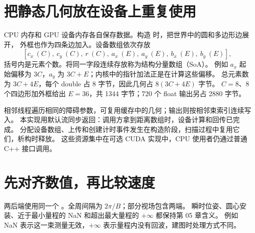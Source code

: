 \section{把静态几何放在设备上重复使用}
CPU 内存和 GPU 设备内存各自保存数据。构造  时，把世界中的圆和多边形边展开，
外框也作为四条边加入。设备数组依次存放
\[
 [c_x\ (C),\ c_y\ (C),\ r\ (C),\ a_x\ (E),\ a_y\ (E),\ b_x\ (E),\ b_y\ (E)],
\]
括号内是元素个数。将同一字段连续存放称为结构分量数组（SoA）。
例如 $a_x$ 起始偏移为 $3C$，$a_y$ 为 $3C+E$；内核中的指针加法正是在计算这些偏移。
总元素数为 $3C+4E$，每个 double 占 8 字节，因此几何占 $8(3C+4E)$ 字节。
$C=8$、8 个四边形加外框给出 $E=36$，共 1344 字节；720 个 float 输出另占 2880 字节。

\begin{center}\begin{minipage}{\linewidth}\makeatletter{}\makeatother
\centering
{}
\caption{扫描的数据流。几何与设备输出缓存跨帧复用，每帧传入位姿并取回本帧距离。}
\end{minipage}\end{center}

相邻线程遍历相同的障碍参数，可复用缓存中的几何；输出则按相邻束索引连续写入。
本实现用默认流同步返回：调用方拿到距离数组时，设备计算和回传已完成。
分配设备数组、上传和创建计时事件发生在构造阶段，扫描过程中复用它们，析构时释放。
这些资源集中在可选 CUDA 实现中，CPU 使用者仍通过普通 C++ 接口调用。

\section{先对齐数值，再比较速度}
两后端使用同一个 。全周间隔为 $2\pi/B$；部分视场包含两端。
瞬时位姿、圆心安装、近于最小量程的 NaN 和超出最大量程的 $+\infty$ 都保持第 05 章含义。
例如 NaN 表示这一束测量无效，$+\infty$ 表示量程内没有回波，建图时处理方式不同。

